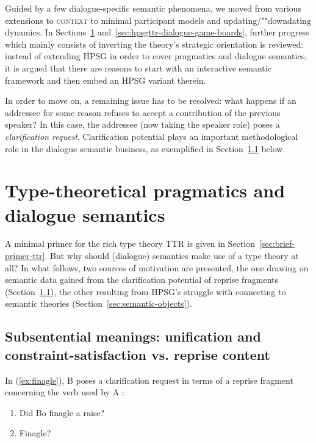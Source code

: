 \documentclass[output=paper
 	        ,biblatex
                ,babelshorthands
                ,newtxmath
                ,draftmode
                ,colorlinks, citecolor=brown
]{langscibook}
\begin{document}
Guided by a few dialogue-specific semantic phenomena, we moved from various extensions to \textsc{context}  to minimal participant models and updating/""downdating dynamics.
%
In Sections~\ref{sec:type-theory-pragmatics-semantics} and~\ref{sec:hpsgttr-dialogue-game-boards}, further progress which mainly consists of inverting the theory's strategic orientation is reviewed: instead of extending HPSG in order to cover pragmatics and dialogue semantics, it is argued that there are reasons to start with an interactive semantic framework and then embed an HPSG variant therein.


In order to move on, a remaining issue has to be resolved: what happens if an addressee for some reason refuses to accept a contribution of the previous speaker?
%
In this case, the addressee (now taking the speaker role) poses a \emph{clarification request}. 
%
Clarification potential  plays an important methodological role in the dialogue semantic business, as exemplified in Section~\ref{sec:sub-sentential-meanings} below. 




\section{Type-theoretical pragmatics and dialogue semantics}
\label{sec:type-theory-pragmatics-semantics}

A minimal primer for the rich type theory TTR is given in Section~\ref{sec:brief-primer-ttr}. 
%
But why should (dialogue) semantics make use of a type theory at all?
%
In what follows, two sources of motivation are presented, the one drawing on semantic data gained from the clarification potential of reprise fragments (Section~\ref{sec:sub-sentential-meanings}), the other resulting from HPSG's struggle with connecting to semantic theories (Section~\ref{sec:semantic-objects}).



  
\subsection{Subsentential meanings: unification and constraint-satisfaction vs. reprise content}
\label{sec:sub-sentential-meanings}

In (\ref{ex:finagle}), B poses a clarification request in terms of a reprise fragment concerning the verb used by A \citep[]{Ginzburg:2012}:
%
\ea \label{ex:finagle}
\begin{enumerate}[noitemsep]
\item {} Did Bo finagle a raise?
\item {} Finagle?
\end{enumerate}
\z
\end{document}
